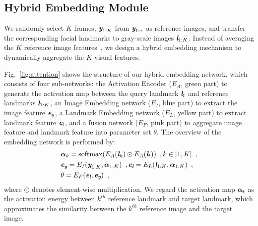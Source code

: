 \documentclass[runningheads]{llncs}
\def\mathbi#1{\textbf{\em #1}}
\begin{document}
\subsection{Hybrid Embedding Module}
\label{subsec:details}
We randomly select $K$ frames, $\mathbi{y}_{1:K}$ from $\mathbi{y}_{1:\tau}$ as reference images, and transfer the corresponding facial landmarks to gray-scale images $\mathbi{l}_{1:K}$. Instead of averaging the $K$ reference image features~\cite{zakharov2019few,chung2017you,wiles2018x2face}, we design a hybrid embedding mechanism to dynamically aggregate the $K$ visual features.

Fig.~\ref{fig:attention} shows the structure of our hybrid embedding network, which consists of four sub-networks: the Activation Encoder ($E_{A}$, green part) to generate the activation map between the query landmark $\mathbi{l}_t$ and reference landmarks $\mathbi{l}_{1:K}$, an Image Embedding network ($E_{I}$, blue part) to extract the image feature $\mathbi{e}_{y}$, a Landmark Embedding network ($E_{L}$, yellow part) to extract landmark feature $\mathbi{e}_{l}$, and a fusion network ($E_{F}$, pink part) to aggregate image feature and landmark feature into parameter set $\theta$. The overview of the embedding network is performed by:
\begin{align}
\label{eq:attention}
&\boldsymbol{\alpha}_{k} = \text{softmax}( E_{A}(\mathbi{l}_k) \odot E_{A}(\mathbi{l}_t))\enspace , k \in [1,K]
\enspace, \\
\label{eq:img_embed}
&\mathbi{e}_{\mathbi{y}} =  E_{I}(\mathbi{y}_{1:K}, \boldsymbol{\alpha}_{1:K})
\enspace,  \mathbi{e}_{\mathbi{l}} =  E_{L}(\mathbi{l}_{1:K}, \boldsymbol{\alpha}_{1:K})   \enspace, \\
\label{eq:fusion}
&\theta  = E_F(\mathbi{e}_{\mathbi{l}}, \mathbi{e}_{\mathbi{y}}) \enspace, 
\end{align}
where $\odot$ denotes element-wise multiplication. We regard the activation map $\boldsymbol{\alpha}_{k}$ as the activation energy between ${k^{th}}$ reference landmark and target landmark, which approximates the similarity between the ${k^{th}}$ reference image and the target image. 
\end{document}
